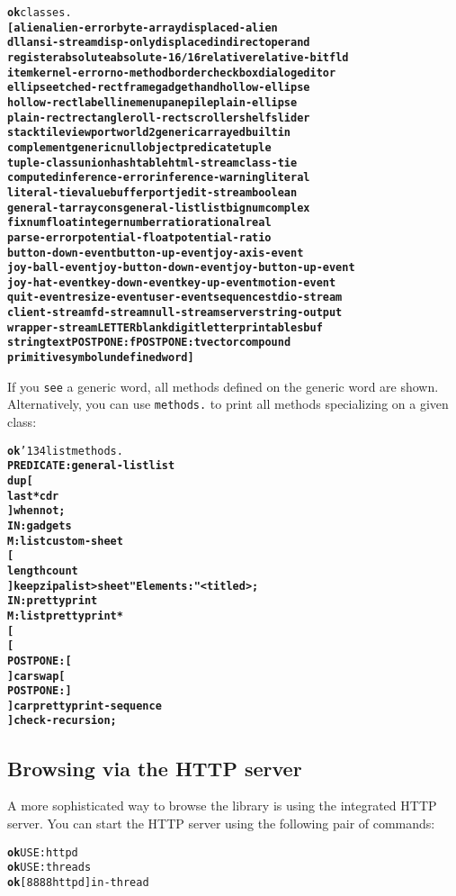 \documentclass{book}
\newcommand{\bs}{\char'134}
\begin{document}
\begin{alltt}
\textbf{ok} classes.
\textbf{[ alien alien-error byte-array displaced-alien
dll ansi-stream disp-only displaced indirect operand
register absolute absolute-16/16 relative relative-bitfld
item kernel-error no-method border checkbox dialog editor
ellipse etched-rect frame gadget hand hollow-ellipse
hollow-rect label line menu pane pile plain-ellipse
plain-rect rectangle roll-rect scroller shelf slider
stack tile viewport world 2generic arrayed builtin
complement generic null object predicate tuple
tuple-class union hashtable html-stream class-tie
computed inference-error inference-warning literal
literal-tie value buffer port jedit-stream boolean
general-t array cons general-list list bignum complex
fixnum float integer number ratio rational real
parse-error potential-float potential-ratio
button-down-event button-up-event joy-axis-event
joy-ball-event joy-button-down-event joy-button-up-event
joy-hat-event key-down-event key-up-event motion-event
quit-event resize-event user-event sequence stdio-stream
client-stream fd-stream null-stream server string-output
wrapper-stream LETTER blank digit letter printable sbuf
string text POSTPONE: f POSTPONE: t vector compound
primitive symbol undefined word ]}
\end{alltt}

If you \texttt{see} a generic word, all methods defined on the generic word are shown.
Alternatively, you can use \texttt{methods.} to print all methods specializing on a
given class:

\begin{alltt}
\textbf{ok} \bs list methods.
\textbf{PREDICATE: general-list list
    dup [
        last* cdr
    ] when not ;
IN: gadgets
M: list custom-sheet
    [
        length count
    ] keep zip alist>sheet "Elements:" <titled> ;
IN: prettyprint
M: list prettyprint*
    [
        [
            POSTPONE: [
        ] car swap [
            POSTPONE: ]
        ] car prettyprint-sequence
    ] check-recursion ;}
\end{alltt}

\subsection{Browsing via the HTTP server}


A more sophisticated way to browse the library is using the integrated HTTP server. You can start the HTTP server using the following pair of commands:

\begin{alltt}
\textbf{ok} USE: httpd
\textbf{ok} USE: threads
\textbf{ok} [ 8888 httpd ] in-thread
\end{alltt}
\end{document}
